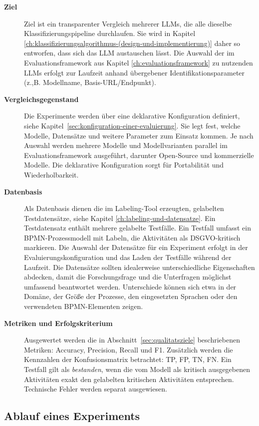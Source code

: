 \begin{description}
    \item[\textbf{Ziel}] Ziel ist ein transparenter Vergleich mehrerer \acp{LLM}, die alle dieselbe Klassifizierungspipeline durchlaufen. Sie wird in Kapitel \ref{ch:klassifizierungsalgorithmus-(design-und-implementierung)} daher so entworfen, dass sich das \ac{LLM} austauschen lässt. Die Auswahl der im Evaluationsframework aus Kapitel \ref{ch:evaluationsframework} zu nutzenden \acp{LLM} erfolgt zur Laufzeit anhand übergebener Identifikationsparameter (z.,B. Modellname, Basis-URL/Endpunkt).
    \item[\textbf{Vergleichsgegenstand}] Die Experimente werden über eine deklarative Konfiguration definiert, siehe Kapitel~\ref{sec:konfiguration-einer-evaluierung}. Sie legt fest, welche Modelle, Datensätze und weitere Parameter zum Einsatz kommen. Je nach Auswahl werden mehrere Modelle und Modellvarianten parallel im Evaluationsframework ausgeführt, darunter Open-Source und kommerzielle Modelle. Die deklarative Konfiguration sorgt für Portabilität und Wiederholbarkeit.
    \item[\textbf{Datenbasis}] Als Datenbasis dienen die im Labeling-Tool erzeugten, gelabelten Testdatensätze, siehe Kapitel \ref{ch:labeling-und-datensatze}. Ein Testdatensatz enthält mehrere gelabelte Testfälle. Ein Testfall umfasst ein \ac{BPMN}-Prozessmodell mit Labeln, die Aktivitäten als \ac{DSGVO}-kritisch markieren. Die Auswahl der Datensätze für ein Experiment erfolgt in der Evaluierungskonfiguration und das Laden der Testfälle während der Laufzeit. Die Datensätze sollten idealerweise unterschiedliche Eigenschaften abdecken, damit die Forschungsfrage und die Unterfragen möglichst umfassend beantwortet werden. Unterschiede können sich etwa in der Domäne, der Größe der Prozesse, den eingesetzten Sprachen oder den verwendeten \ac{BPMN}-Elementen zeigen.
    \item[\textbf{Metriken und Erfolgskriterium}] Ausgewertet werden die in Abschnitt~\ref{sec:qualitatsziele} beschriebenen Metriken: Accuracy, Precision, Recall und F1. Zusätzlich werden die Kennzahlen der Konfusionsmatrix betrachtet: \ac{TP}, \ac{FP}, \ac{TN}, \ac{FN}. Ein Testfall gilt als \emph{bestanden}, wenn die vom Modell als kritisch ausgegebenen Aktivitäten exakt den gelabelten kritischen Aktivitäten entsprechen. Technische Fehler werden separat ausgewiesen.
\end{description}

\subsection*{Ablauf eines Experiments}

